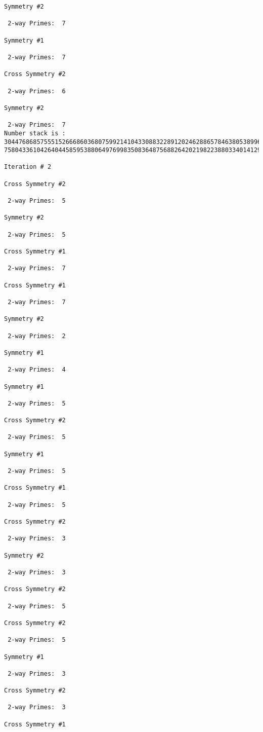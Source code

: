 \begin{verbatim}
Symmetry #2

 2-way Primes: 	7

Symmetry #1

 2-way Primes: 	7

Cross Symmetry #2

 2-way Primes: 	6

Symmetry #2

 2-way Primes: 	7
Number stack is :
30447686857555152666860368075992141043308832289120246288657846380538996794608835958544046240163340857
75804336104264044585953880649769983508364875688264202198223880334014129957086306866625155575868674403

Iteration #	2

Cross Symmetry #2

 2-way Primes: 	5

Symmetry #2

 2-way Primes: 	5

Cross Symmetry #1

 2-way Primes: 	7

Cross Symmetry #1

 2-way Primes: 	7

Symmetry #2

 2-way Primes: 	2

Symmetry #1

 2-way Primes: 	4

Symmetry #1

 2-way Primes: 	5

Cross Symmetry #2

 2-way Primes: 	5

Symmetry #1

 2-way Primes: 	5

Cross Symmetry #1

 2-way Primes: 	5

Cross Symmetry #2

 2-way Primes: 	3

Symmetry #2

 2-way Primes: 	3

Cross Symmetry #2

 2-way Primes: 	5

Cross Symmetry #2

 2-way Primes: 	5

Symmetry #1

 2-way Primes: 	3

Cross Symmetry #2

 2-way Primes: 	3

Cross Symmetry #1


\end{verbatim}
